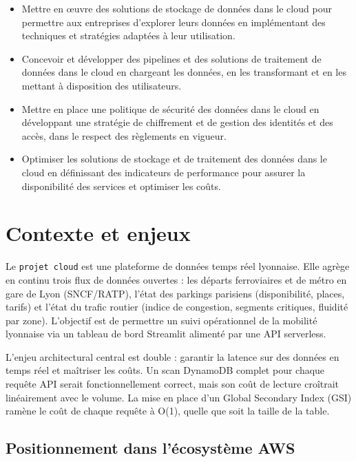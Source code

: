 \documentclass[11pt]{article}
\begin{document}
\begin{itemize}[leftmargin=1.4em, itemsep=3pt, topsep=3pt]
    \item Mettre en \oe{}uvre des solutions de stockage de données dans le cloud pour
    permettre aux entreprises d'explorer leurs données en implémentant des
    techniques et stratégies adaptées à leur utilisation.
    \item Concevoir et développer des pipelines et des solutions de traitement de
    données dans le cloud en chargeant les données, en les transformant et en les
    mettant à disposition des utilisateurs.
    \item Mettre en place une politique de sécurité des données dans le cloud en
    développant une stratégie de chiffrement et de gestion des identités et des
    accès, dans le respect des règlements en vigueur.
    \item Optimiser les solutions de stockage et de traitement des données dans le
    cloud en définissant des indicateurs de performance pour assurer la
    disponibilité des services et optimiser les coûts.
\end{itemize}

\section{Contexte et enjeux}

Le \texttt{projet cloud} est une plateforme de données temps réel lyonnaise. Elle
agrège en continu trois flux de données ouvertes : les départs ferroviaires et de
métro en gare de Lyon (SNCF/RATP), l'état des parkings parisiens (disponibilité,
places, tarifs) et l'état du trafic routier (indice de congestion, segments
critiques, fluidité par zone). L'objectif est de permettre un suivi opérationnel de
la mobilité lyonnaise via un tableau de bord Streamlit alimenté par une API
serverless.

L'enjeu architectural central est double : garantir la latence sur des données en
temps réel et maîtriser les coûts. Un scan DynamoDB complet pour chaque
requête API serait fonctionnellement correct, mais son coût de lecture croîtrait
linéairement avec le volume. La mise en place d'un Global Secondary Index (GSI)
ramène le coût de chaque requête à O(1), quelle que soit la taille de la table.

\subsection{Positionnement dans l'écosystème AWS}
\end{document}
